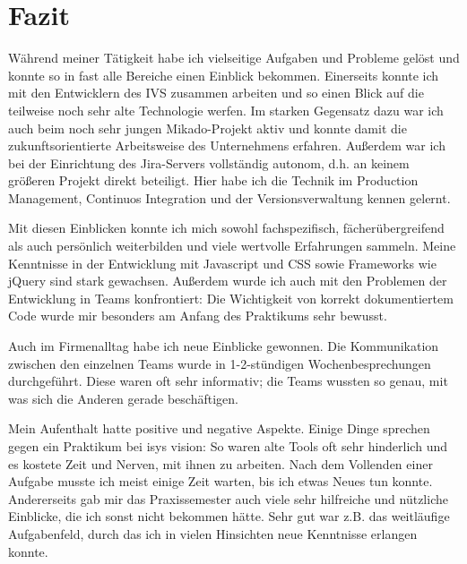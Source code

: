 \chapter{Fazit}
\label{ch:fazit}

Während meiner Tätigkeit habe ich vielseitige Aufgaben und Probleme gelöst und konnte so in fast alle Bereiche einen Einblick bekommen. Einerseits konnte ich mit den Entwicklern des IVS zusammen arbeiten und so einen Blick auf die teilweise noch sehr alte Technologie werfen. Im starken Gegensatz dazu war ich auch beim noch sehr jungen Mikado-Projekt aktiv und konnte damit die zukunftsorientierte Arbeitsweise des Unternehmens erfahren. Außerdem war ich bei der Einrichtung des Jira-Servers vollständig autonom, d.h. an keinem größeren Projekt direkt beteiligt. Hier habe ich die Technik im Production Management, Continuos Integration und der Versionsverwaltung kennen gelernt.

Mit diesen Einblicken konnte ich mich sowohl fachspezifisch, fächerübergreifend als auch persönlich weiterbilden und viele wertvolle Erfahrungen sammeln. Meine Kenntnisse in der Entwicklung mit Javascript und CSS sowie Frameworks wie jQuery sind stark gewachsen. Außerdem wurde ich auch mit den Problemen der Entwicklung in Teams konfrontiert: Die Wichtigkeit von korrekt dokumentiertem Code wurde mir besonders am Anfang des Praktikums sehr bewusst.

Auch im Firmenalltag habe ich neue Einblicke gewonnen. Die Kommunikation zwischen den einzelnen Teams wurde in 1-2-stündigen Wochenbesprechungen durchgeführt. Diese waren oft sehr informativ; die Teams wussten so genau, mit was sich die Anderen gerade beschäftigen.

Mein Aufenthalt hatte positive und negative Aspekte. Einige Dinge sprechen gegen ein Praktikum bei isys vision: So waren alte Tools oft sehr hinderlich und es kostete Zeit und Nerven, mit ihnen zu arbeiten. Nach dem Vollenden einer Aufgabe musste ich meist einige Zeit warten, bis ich etwas Neues tun konnte.
Andererseits gab mir das Praxissemester auch viele sehr hilfreiche und nützliche Einblicke, die ich sonst nicht bekommen hätte. Sehr gut war z.B. das weitläufige Aufgabenfeld, durch das ich in vielen Hinsichten neue Kenntnisse erlangen konnte.

